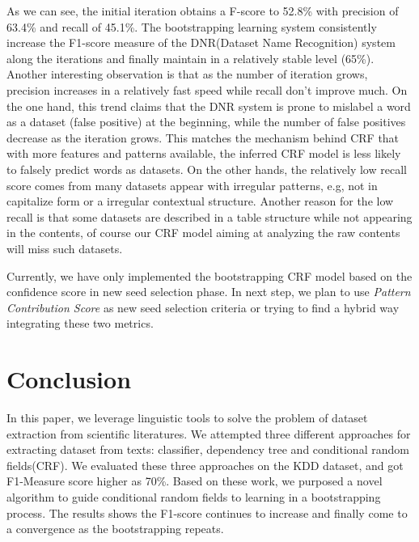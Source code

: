\documentclass[10pt]{article}
\begin{document}
As we can see, the initial iteration obtains a F-score to 52.8\% with precision of 63.4\% and recall of 45.1\%. The bootstrapping learning system consistently increase the F1-score measure of the DNR(Dataset Name Recognition) system along the iterations and finally maintain in a relatively stable level (65\%). Another interesting observation is that as the number of iteration grows, precision increases in a relatively fast speed while recall don't improve much. On the one hand, this trend claims that the DNR system is prone to mislabel a word as a dataset (false positive) at the beginning, while the number of false positives decrease as the iteration grows. This matches the mechanism behind CRF that with more features and patterns available, the inferred CRF model is less likely to falsely predict words as datasets. On the other hands, the relatively low recall score comes from many datasets appear with irregular patterns, e.g, not in capitalize form or a irregular contextual structure. Another reason for the low recall is that some datasets are described in a table structure while not appearing in the contents, of course our CRF model aiming at analyzing the raw contents will miss such datasets.

Currently, we have only implemented the bootstrapping CRF model based on the confidence score in new seed selection phase. In next step, we plan to use \emph{Pattern Contribution Score} as new seed selection criteria or trying to find a hybrid way integrating these two metrics.

\section{Conclusion}
In this paper, we leverage linguistic tools to solve the problem of dataset extraction from scientific literatures. We attempted three different approaches for extracting dataset from texts: classifier, dependency tree and conditional random fields(CRF). We evaluated these three approaches on the KDD dataset, and got F1-Measure score higher as 70\%. Based on these work, we purposed a novel algorithm to guide conditional random fields to learning in a bootstrapping process. The results shows the F1-score continues to increase and finally come to a convergence as the bootstrapping repeats.



\end{document}

